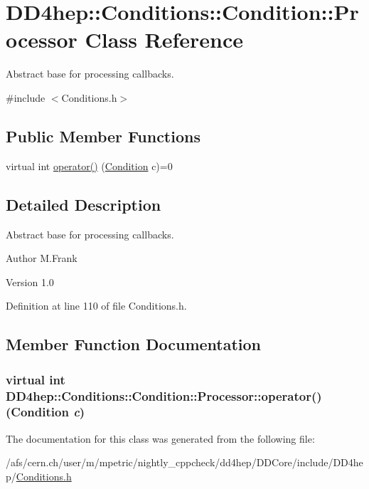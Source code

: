 \hypertarget{class_d_d4hep_1_1_conditions_1_1_condition_1_1_processor}{
\section{DD4hep::Conditions::Condition::Processor Class Reference}
\label{class_d_d4hep_1_1_conditions_1_1_condition_1_1_processor}
}


Abstract base for processing callbacks.  


{\ttfamily \#include $<$Conditions.h$>$}\subsection*{Public Member Functions}
\begin{DoxyCompactItemize}
\item 
virtual int \hyperlink{class_d_d4hep_1_1_conditions_1_1_condition_1_1_processor_a100f41263aaf78bd70feccb59fed3939}{operator()} (\hyperlink{class_d_d4hep_1_1_conditions_1_1_condition}{Condition} c)=0
\end{DoxyCompactItemize}


\subsection{Detailed Description}
Abstract base for processing callbacks. \begin{DoxyAuthor}{Author}
M.Frank 
\end{DoxyAuthor}
\begin{DoxyVersion}{Version}
1.0 
\end{DoxyVersion}


Definition at line 110 of file Conditions.h.

\subsection{Member Function Documentation}
\hypertarget{class_d_d4hep_1_1_conditions_1_1_condition_1_1_processor_a100f41263aaf78bd70feccb59fed3939}{
\subsubsection[{operator()}]{\setlength{\rightskip}{0pt plus 5cm}virtual int DD4hep::Conditions::Condition::Processor::operator() ({\bf Condition} {\em c})}}
\label{class_d_d4hep_1_1_conditions_1_1_condition_1_1_processor_a100f41263aaf78bd70feccb59fed3939}


The documentation for this class was generated from the following file:\begin{DoxyCompactItemize}
\item 
/afs/cern.ch/user/m/mpetric/nightly\_\-cppcheck/dd4hep/DDCore/include/DD4hep/\hyperlink{_conditions_8h}{Conditions.h}\end{DoxyCompactItemize}
